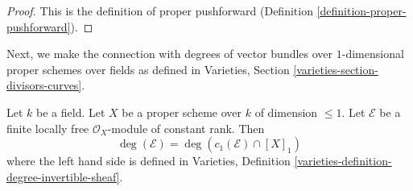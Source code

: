 \begin{proof}
This is the definition of proper pushforward
(Definition \ref{definition-proper-pushforward}).
\end{proof}

\noindent
Next, we make the connection with degrees of vector bundles
over $1$-dimensional proper schemes over fields as defined in
Varieties, Section \ref{varieties-section-divisors-curves}.

\begin{lemma}
\label{lemma-degree-vector-bundle}
Let $k$ be a field. Let $X$ be a proper scheme over $k$ of dimension $\leq 1$.
Let $\mathcal{E}$ be a finite locally free $\mathcal{O}_X$-module of constant
rank. Then
$$
\deg(\mathcal{E}) = \deg(c_1(\mathcal{E}) \cap [X]_1)
$$
where the left hand side is defined in
Varieties, Definition \ref{varieties-definition-degree-invertible-sheaf}.
\end{lemma}

